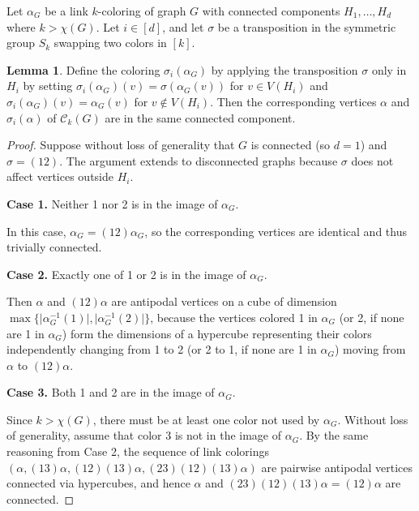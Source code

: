 \documentclass{amsart}
\theoremstyle{hypothesisstyle}
\newcommand{\set}[1]{\{#1\}}
\theoremstyle{definition}
\newtheorem{lemma}[theorem]{Lemma}
\theoremstyle{remark}
\numberwithin{equation}{section}
\newcommand{\abs}[1]{\lvert#1\rvert}
\newcommand{\C}{\mathcal C}
\begin{document}
Let $\alpha_G$ be a link $k$-coloring of graph $G$ with connected components $H_1,\dots,H_d$ where $k>\chi(G)$. Let $i\in[d]$, and let $\sigma$ be a transposition in the symmetric group $S_k$ swapping two colors in $[k]$. 

\begin{lemma}\label{lem:cube-adjacency} Define the coloring $\sigma_i(\alpha_G)$ by applying the transposition $\sigma$ only in $H_i$ by setting $\sigma_i(\alpha_G)(v)=\sigma(\alpha_G(v))$ for $v\in V(H_i)$ and $\sigma_i(\alpha_G)(v)=\alpha_G(v)$ for $v\notin V(H_i)$. Then the corresponding vertices $\alpha$ and $\sigma_i(\alpha)$ of $\C_k(G)$ are in the same connected component. \end{lemma}
\begin{proof}
Suppose without loss of generality that $G$ is connected (so $d=1$) and $\sigma=(12)$. The argument extends to disconnected graphs because $\sigma$ does not affect vertices outside $H_i$. 

\textbf{Case 1.} Neither 1 nor 2 is in the image of $\alpha_G$.

 In this case, $\alpha_G=(12)\alpha_G$, so the corresponding vertices are identical and thus trivially connected. 
 
\textbf{Case 2.} Exactly one of 1 or 2 is in the image of $\alpha_G$. 

Then $\alpha$ and $(12)\alpha$ are antipodal vertices on a cube of dimension $\max\set{\abs{\alpha_G^{-1}(1)},\abs{\alpha_G^{-1}(2)}}$, because the vertices colored 1 in $\alpha_G$ (or 2, if none are 1 in $\alpha_G$) form the dimensions of a hypercube representing their colors independently changing from 1 to 2 (or 2 to 1, if none are 1 in $\alpha_G$) moving from $\alpha$ to $(12)\alpha$. 

\textbf{Case 3.} Both 1 and 2 are in the image of $\alpha_G$. 

Since $k>\chi(G)$, there must be at least one color not used by $\alpha_G$. Without loss of generality, assume that color 3 is not in the image of $\alpha_G$. By the same reasoning from Case 2, the sequence of link colorings $(\alpha,(13)\alpha,(12)(13)\alpha,(23)(12)(13)\alpha)$ are pairwise antipodal vertices connected via hypercubes, and hence $\alpha$ and $(23)(12)(13)\alpha=(12)\alpha$ are connected.
\end{proof}
\end{document}

